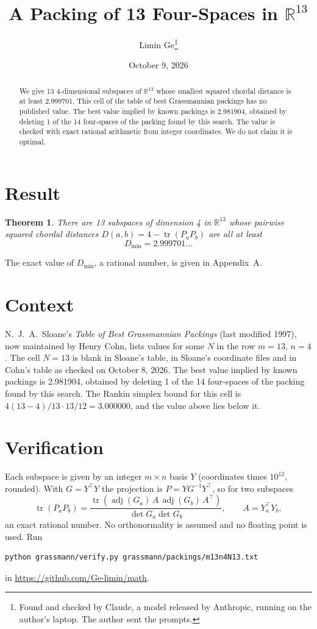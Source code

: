 \documentclass[11pt,a4paper]{article}
\title{A Packing of 13 Four-Spaces in $\mathbb{R}^{13}$}
\author{Limin Ge\thanks{Found and checked by Claude, a model released by Anthropic, running on the author's laptop. The author sent the prompts.}}
\date{October 9, 2026}
\newtheorem*{theorem}{Theorem}
\begin{document}
\maketitle
\begin{abstract}
We give 13 4-dimensional subspaces of $\mathbb{R}^{13}$ whose smallest squared chordal distance is at least 2.999701. This cell of the table of best Grassmannian packings has no published value. The best value implied by known packings is 2.981904, obtained by deleting 1 of the 14 four-spaces of the packing found by this search. The value is checked with exact rational arithmetic from integer coordinates. We do not claim it is optimal.
\end{abstract}

\section{Result}
\begin{theorem}
There are 13 subspaces of dimension 4 in $\mathbb{R}^{13}$ whose pairwise squared chordal distances $D(a,b) = 4 - \operatorname{tr}(P_aP_b)$ are all at least
\[ D_{\min} = 2.999701\ldots \]
\end{theorem}
The exact value of $D_{\min}$, a rational number, is given in Appendix~A.


\section{Context}
N.~J.~A.~Sloane's \emph{Table of Best Grassmannian Packings} (last modified 1997), now maintained by Henry Cohn, lists values for some $N$ in the row $m=13$, $n=4$. The cell $N=13$ is blank in Sloane's table, in Sloane's coordinate files and in Cohn's table as checked on October 8, 2026. The best value implied by known packings is 2.981904, obtained by deleting 1 of the 14 four-spaces of the packing found by this search. The Rankin simplex bound for this cell is $4(13-4)/13\cdot 13/12 = 3.000000$, and the value above lies below it.


\section{Verification}
Each subspace is given by an integer $m\times n$ basis $Y$ (coordinates times $10^{12}$, rounded). With $G=Y^\top Y$ the projection is $P=YG^{-1}Y^\top$, so for two subspaces
\[ \operatorname{tr}(P_aP_b)=\frac{\operatorname{tr}(\operatorname{adj}(G_a)\,A\,\operatorname{adj}(G_b)\,A^\top)}{\det G_a\det G_b},\qquad A=Y_a^\top Y_b, \]
an exact rational number. No orthonormality is assumed and no floating point is used. Run
\begin{verbatim}
python grassmann/verify.py grassmann/packings/m13n4N13.txt
\end{verbatim}
in \url{https://github.com/Ge-limin/math}.
\end{document}
